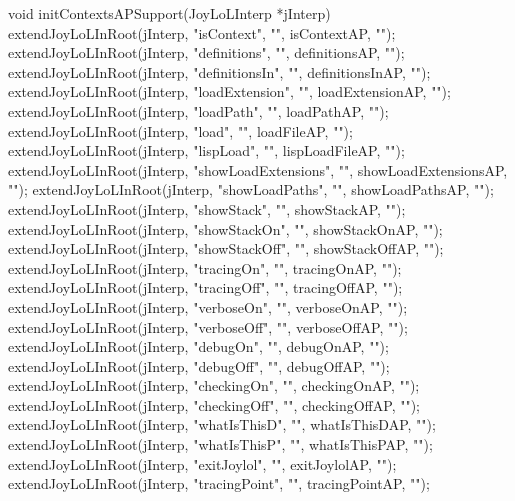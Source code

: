 \startCCode
void initContextsAPSupport(JoyLoLInterp *jInterp) {
  extendJoyLoLInRoot(jInterp, "isContext",          "", isContextAP,          "");
  extendJoyLoLInRoot(jInterp, "definitions",        "", definitionsAP,        "");
  extendJoyLoLInRoot(jInterp, "definitionsIn",      "", definitionsInAP,      "");
  extendJoyLoLInRoot(jInterp, "loadExtension",      "", loadExtensionAP,      "");
  extendJoyLoLInRoot(jInterp, "loadPath",           "", loadPathAP,           "");
  extendJoyLoLInRoot(jInterp, "load",               "", loadFileAP,           "");
  extendJoyLoLInRoot(jInterp, "lispLoad",           "", lispLoadFileAP,       "");
  extendJoyLoLInRoot(jInterp, "showLoadExtensions", "", showLoadExtensionsAP, "");
  extendJoyLoLInRoot(jInterp, "showLoadPaths",      "", showLoadPathsAP,      "");
  extendJoyLoLInRoot(jInterp, "showStack",          "", showStackAP,          "");
  extendJoyLoLInRoot(jInterp, "showStackOn",        "", showStackOnAP,        "");
  extendJoyLoLInRoot(jInterp, "showStackOff",       "", showStackOffAP,       "");
  extendJoyLoLInRoot(jInterp, "tracingOn",          "", tracingOnAP,          "");
  extendJoyLoLInRoot(jInterp, "tracingOff",         "", tracingOffAP,         "");
  extendJoyLoLInRoot(jInterp, "verboseOn",          "", verboseOnAP,          "");
  extendJoyLoLInRoot(jInterp, "verboseOff",         "", verboseOffAP,         "");
  extendJoyLoLInRoot(jInterp, "debugOn",            "", debugOnAP,            "");
  extendJoyLoLInRoot(jInterp, "debugOff",           "", debugOffAP,           "");
  extendJoyLoLInRoot(jInterp, "checkingOn",         "", checkingOnAP,         "");
  extendJoyLoLInRoot(jInterp, "checkingOff",        "", checkingOffAP,        "");
  extendJoyLoLInRoot(jInterp, "whatIsThisD",        "", whatIsThisDAP,        "");
  extendJoyLoLInRoot(jInterp, "whatIsThisP",        "", whatIsThisPAP,        "");
  extendJoyLoLInRoot(jInterp, "exitJoylol",         "", exitJoylolAP,         "");
  extendJoyLoLInRoot(jInterp, "tracingPoint",       "", tracingPointAP,       "");
}
\stopCCode
